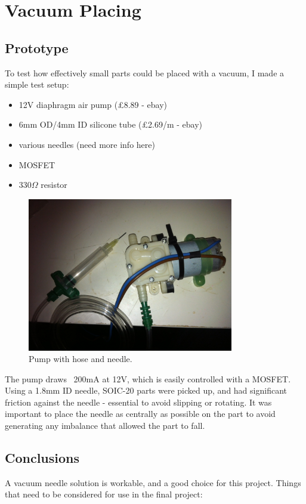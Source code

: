 \documentclass[a4paper,11pt]{article}  %
\begin{document}
\section{Vacuum Placing}
\subsection{Prototype}
To test how effectively small parts could be placed with a vacuum, I made a simple test setup:

\begin{itemize} \itemsep0em
	\item	12V diaphragm air pump (£8.89 - ebay)
	\item	6mm OD/4mm ID silicone tube (£2.69/m - ebay)
	\item	various needles (need more info here)
	\item	MOSFET
	\item	330$\Omega$ resistor
\end{itemize}

\begin{figure}[ht!]
\centering
\includegraphics[width=90mm]{resources/pump_and_hose.jpg}
\caption{Pump with hose and needle.}
\label{hose and needle}
\end{figure}

The pump draws ~200mA at 12V, which is easily controlled with a MOSFET. Using a 1.8mm ID needle, SOIC-20 parts were picked up, 
and had significant friction against the needle - essential to avoid slipping or rotating. It was important to place the needle 
as centrally as possible on the part to avoid generating any imbalance that allowed the part to fall. 

\subsection{Conclusions}
A vacuum needle solution is workable, and a good choice for this project. Things that need to be considered for use in the final project:
\end{document}
